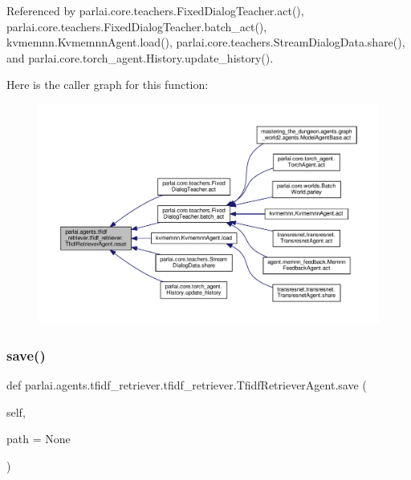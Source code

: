 Referenced by parlai.\+core.\+teachers.\+Fixed\+Dialog\+Teacher.\+act(), parlai.\+core.\+teachers.\+Fixed\+Dialog\+Teacher.\+batch\+\_\+act(), kvmemnn.\+Kvmemnn\+Agent.\+load(), parlai.\+core.\+teachers.\+Stream\+Dialog\+Data.\+share(), and parlai.\+core.\+torch\+\_\+agent.\+History.\+update\+\_\+history().

Here is the caller graph for this function\+:
\nopagebreak
\begin{figure}[H]
\begin{center}
\leavevmode
\includegraphics[width=350pt]{classparlai_1_1agents_1_1tfidf__retriever_1_1tfidf__retriever_1_1TfidfRetrieverAgent_a4d9e8962cb44451758ea13b09b8dbd86_icgraph}
\end{center}
\end{figure}
\mbox{\label{classparlai_1_1agents_1_1tfidf__retriever_1_1tfidf__retriever_1_1TfidfRetrieverAgent_af740335de006f8ead33b632afa1c4dcd}} 
\subsubsection{\texorpdfstring{save()}{save()}}
{\footnotesize\ttfamily def parlai.\+agents.\+tfidf\+\_\+retriever.\+tfidf\+\_\+retriever.\+Tfidf\+Retriever\+Agent.\+save (\begin{DoxyParamCaption}\item[{}]{self,  }\item[{}]{path = {\ttfamily None} }\end{DoxyParamCaption})}



